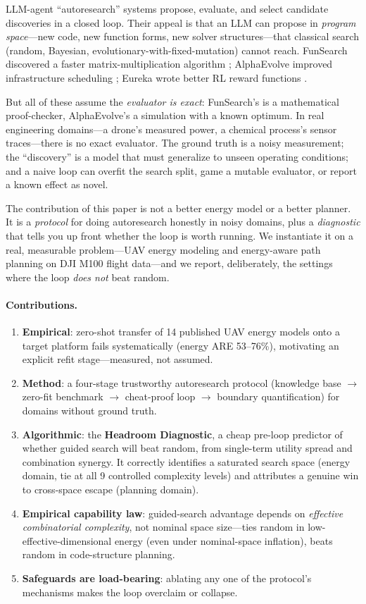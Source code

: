 \documentclass{article}
\begin{document}
LLM-agent ``autoresearch'' systems propose, evaluate, and select candidate discoveries in
a closed loop. Their appeal is that an LLM can propose in \emph{program space}---new
code, new function forms, new solver structures---that classical search (random,
Bayesian, evolutionary-with-fixed-mutation) cannot reach. FunSearch discovered a faster
matrix-multiplication algorithm \citep{funsearch}; AlphaEvolve improved infrastructure
scheduling \citep{alphaevolve}; Eureka wrote better RL reward functions
\citep{eureka}.

But all of these assume the \emph{evaluator is exact}: FunSearch's is a mathematical
proof-checker, AlphaEvolve's a simulation with a known optimum. In real engineering
domains---a drone's measured power, a chemical process's sensor traces---there is no
exact evaluator. The ground truth is a noisy measurement; the ``discovery'' is a model
that must generalize to unseen operating conditions; and a naive loop can overfit the
search split, game a mutable evaluator, or report a known effect as novel.

The contribution of this paper is not a better energy model or a better planner. It is a
\emph{protocol} for doing autoresearch honestly in noisy domains, plus a
\emph{diagnostic} that tells you up front whether the loop is worth running. We
instantiate it on a real, measurable problem---UAV energy modeling and energy-aware path
planning on DJI M100 flight data---and we report, deliberately, the settings where the
loop \emph{does not} beat random.

\paragraph{Contributions.}
\begin{enumerate}
  \item \textbf{Empirical}: zero-shot transfer of 14 published UAV energy models onto a
    target platform fails systematically (energy ARE 53--76\%), motivating an explicit
    refit stage---measured, not assumed.
  \item \textbf{Method}: a four-stage trustworthy autoresearch protocol (knowledge base
    $\rightarrow$ zero-fit benchmark $\rightarrow$ cheat-proof loop $\rightarrow$
    boundary quantification) for domains without ground truth.
  \item \textbf{Algorithmic}: the \textbf{Headroom Diagnostic}, a cheap pre-loop
    predictor of whether guided search will beat random, from single-term utility spread
    and combination synergy. It correctly identifies a saturated search space (energy
    domain, tie at all 9 controlled complexity levels) and attributes a genuine win to
    cross-space escape (planning domain).
  \item \textbf{Empirical capability law}: guided-search advantage depends on
    \emph{effective combinatorial complexity}, not nominal space size---ties random in
    low-effective-dimensional energy (even under nominal-space inflation), beats random
    in code-structure planning.
  \item \textbf{Safeguards are load-bearing}: ablating any one of the protocol's
    mechanisms makes the loop overclaim or collapse.
\end{enumerate}
\end{document}
